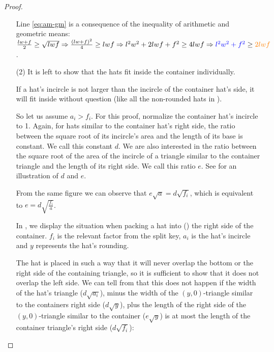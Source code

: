 \documentclass[a4paper,style=print,bibliography=totoc,nexus,lnum,extramargin]{tubsbook}
\begin{document}
\begin{proof}
\begin{itemize}
            Line \ref{eq:am-gm} is a consequence of the inequality of arithmetic and geometric means: $\frac{lw+f}{2} \ge \sqrt{lwf} \Rightarrow \frac{(lw+f)^2}{4} \ge lwf \Rightarrow l^2w^2 + 2 lwf + f^2 \ge 4 lwf \Rightarrow \textcolor{blue}{l^2w^2 + f^2} \ge \textcolor{orange}{2lwf}$.

        \item[(2)]
            It is left to show that the hats fit inside the container individually.

            If a hat's incircle is not larger than the incircle of the container hat's side, it will fit inside without question (like all the non-rounded hats in ).

            So let us assume $a_i > f_i$. For this proof, normalize the container hat's incircle to 1. Again, for hats similar to the container hat's right side, the ratio between the square root of its incircle's area and the length of its base is constant. We call this constant $d$.
            We are also interested in the ratio between the square root of the area of the incircle of a triangle similar to the container triangle and the length of its right side. We call this ratio $e$. See  for an illustration of $d$ and $e$.


            From the same figure we can observe that
            $e\sqrt{a} = d\sqrt{f_i}$, which is equivalent to $e = d\sqrt{\frac{f_i}{a}}$.


            In , we display the situation when packing a hat into (\wlofg) the right side of the container. $f_i$ is the relevant factor from the split key, $a_i$ is the hat's incircle and $y$ represents the hat's rounding.


            The hat is placed in such a way that it will never overlap the bottom or the right side of the containing triangle, so it is sufficient to show that it does not overlap the left side.
            We can tell from  that this does not happen if the width of the hat's triangle ($d\sqrt{a_i}$), minus the width of the $(y,0)$-triangle similar to the containers right side ($d\sqrt{y}$), plus the length of the right side of the $(y,0)$-triangle similar to the container ($e\sqrt{y}$) is at most the length of the container triangle's right side ($d\sqrt{f_i}$):


\end{itemize}
\end{proof}
\end{document}
